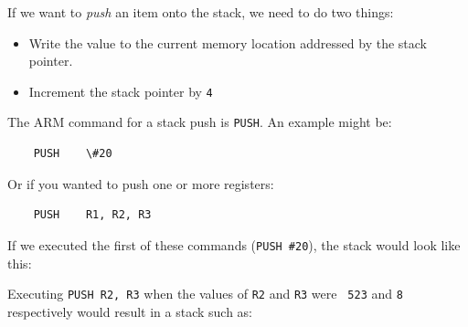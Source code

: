 \documentclass{article}
\begin{document}
\begin{center}
\begin{drawstack}
		
		
		
		
		
\end{drawstack}
\end{center}

If we want to {\it push} an item onto the stack, we need to do two things:

\begin{itemize}

	\item Write the value to the current memory location addressed by the stack pointer.

	\item Increment the stack pointer by {\tt 4}

\end{itemize}

The ARM command for a stack push is {\tt PUSH}. An example might be:

\begin{verbatim}
	PUSH 	\#20
\end{verbatim}

Or if you wanted to push one or more registers:

\begin{verbatim}
	PUSH 	R1, R2, R3
\end{verbatim}

If we executed the first of these commands ({\tt PUSH \#20}), the stack would
look like this:

\begin{center}
\begin{drawstack}
		
		
		
		
		
\end{drawstack}
\end{center}

Executing {\tt PUSH R2, R3} when the values of {\tt R2} and {\tt R3} were {\tt
523} and {\tt 8} respectively would result in a stack such as:

\begin{center}
\begin{drawstack}
		
		
		
		
		
\end{drawstack}
\end{center}
\end{document}
